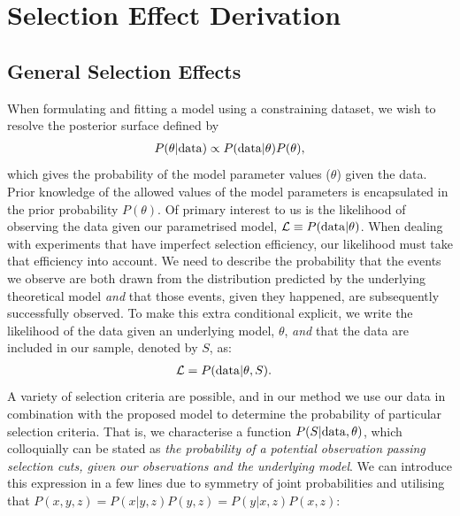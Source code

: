 \documentclass[a4paper,fleqn,usenatbib]{mnras}
\begin{document}









\appendix

\section{Selection Effect Derivation}
\label{app:selection}

\subsection{General Selection Effects}
\label{app:selection1}
When formulating and fitting a model using a constraining dataset, we wish to resolve the posterior surface defined by
\begin{align}
P(\theta | {\rm data}) \propto P({\rm data} | \theta) P(\theta),
\end{align}
which gives the probability of the model parameter values ($\theta$) given the data.  Prior knowledge of the allowed values of the model parameters is encapsulated in the prior probability $P(\theta)$. Of primary interest to us is the likelihood of observing the data given our parametrised model, $\mathcal{L} \equiv P({\rm data} | \theta)$. When dealing with experiments that have imperfect selection efficiency, our likelihood must take that efficiency into account.  We need to describe the probability that the events we observe are both drawn from the distribution predicted by the underlying theoretical model \textit{and} that those events, given they happened, are subsequently successfully observed.  To make this extra conditional explicit, we write the likelihood of the data given an underlying model, $\theta$, \textit{and} that the data are included in our sample, denoted by $S$, as:
\begin{align}
\mathcal{L} &= P({\rm data} | \theta, S). \label{eq:app_like}
\end{align}
A variety of selection criteria are possible, and in our method we use our data in combination with the proposed model to determine the probability of particular selection criteria.  That is, we characterise a function $P(S|{\rm data},\theta)$, which colloquially can be stated as \textit{the probability of a potential observation passing selection cuts, given our observations and the underlying model}. We can introduce this expression in a few lines due to symmetry of joint probabilities and utilising that $P(x,y,z) = P(x|y,z)P(y,z) = P(y|x, z)P(x, z)$:
\end{document}
